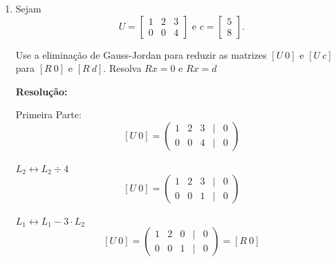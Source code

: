 \documentclass[leqno]{article}
\numberwithin{equation}{section}
\newenvironment{sol}
{
	\vspace{4mm}
	\noindent\textbf{Resolução:}
	\strut\newline
	\smallskip
	\hspace{-3.5mm}
}
{}
\begin{document}
\begin{enumerate}
\begin{enumerate}
\begin{sol}
			\end{sol} 
			
			\item Se $A$ é inversível, não existe nenhuma solução $x_n$ no núcleo.
			
			\begin{sol} 
				Se $A$ é inversível $\Rightarrow$ $N(A) = \varnothing$\\
				\vspace{0.2cm}
				Seja $x_n \in N(A)$, tal que $A \cdot x_n = 0$\\
				\vspace{0.2cm}
				Para $A$ inversível, então:\\
				\vspace{0.2cm}
				$A^{-1} \cdot A \cdot x_n = A^{-1} \cdot 0$\\
				\vspace{0.2cm}
				$x_n = 0$\\
				\vspace{0.2cm}
				0 pertence ao núcleo.\\
			\end{sol} 
			
		\end{enumerate}
		
		\item Sejam
		$$U = \begin{bmatrix} 
			1 & 2 & 3 \\
			0 & 0 & 4
		\end{bmatrix} \mbox{ e } c = \begin{bmatrix} 
			5 \\
			8
		\end{bmatrix}.$$
		
		Use a eliminação de Gauss-Jordan para reduzir as matrizes $[U \ 0]$ e $[U \ c]$ para $[R \ 0]$ e $[R \ d]$. Resolva $Rx = 0$ e $Rx = d$
		
		\begin{sol} 
			Primeira Parte:\\
		$$	[U \ 0] = \begin{pmatrix}
				1 & 2 & 3 & | & 0 \\
				0 & 0 & 4 & | & 0 
			\end{pmatrix}$$\\
		\vspace{0.2cm}
		$L_2 \leftrightarrow L_2 \div 4$\\
		$$[U \ 0] = \begin{pmatrix}
			1 & 2 & 3 & | & 0 \\
			0 & 0 & 1 & | & 0 
		\end{pmatrix}$$\\
		\vspace{0.2cm}
		$L_1 \leftrightarrow L_1 - 3 \cdot L_2$\\
		$$	[U \ 0] = \begin{pmatrix}
			1 & 2 & 0 & | & 0 \\
			0 & 0 & 1 & | & 0  
		\end{pmatrix} = [R \ 0]$$\\
		\vspace{0.2cm}
		

\end{sol}
\end{enumerate}
\end{document}
